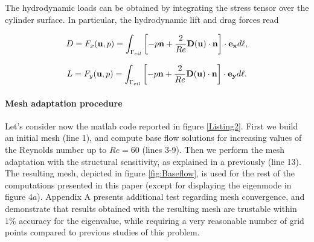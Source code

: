 \documentclass[twocolumn,10pt]{asme2ej}
\newcommand{\be}[1]{ \begin{equation} \label{#1}}
\newcommand{\ee}{\end{equation}}
\begin{document}
The hydrodynamic loads can be obtained by integrating the stress tensor over the cylinder surface.
In particular, the hydrodynamic lift and drag forces read 

\be{drag}
D = F_x ({\bf u},p) = 
 \int_{\Gamma_{cil}} \left[-p {\bf n} + \frac{2}{Re} {\bf D}({\bf u}) \cdot {\bf n} \right]   \cdot {\bf e_x} d\ell,
\ee


\be{lift}
L = F_y ({\bf u},p) = 
 \int_{\Gamma_{cil}} \left[-p {\bf n} + \frac{2}{Re} {\bf D}({\bf u}) \cdot {\bf n} \right]   \cdot {\bf e_y} d\ell. 
\ee



\paragraph{Mesh adaptation procedure}

Let's consider now the matlab code reported in figure \ref{Listing2}. First we build an initial mesh (line 1), and compute base flow solutions for increasing values of the Reynolds number up to $Re = 60$ (lines 3-9).
Then we perform the mesh adaptation with the structural sensitivity, as explained in a previously (line 13). 
The resulting mesh, depicted in figure \ref{fig:Baseflow}, is used for the rest of the computations presented in this paper (except for displaying the eigenmode in figure 4$a$). 
Appendix A presents additional test regarding mesh convergence, and demonstrate that results obtained with the resulting mesh are trustable within $1\%$ accuracy for the eigenvalue, while requiring a very reasonable number of grid points compared to previous studies of this problem. 









\end{document}
